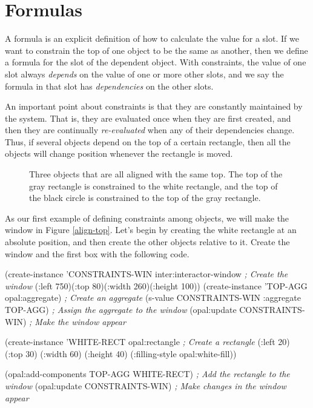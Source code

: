 \section{Formulas}

A formula is an explicit definition of how to calculate the value for
a slot.  If we want to constrain the top of one object to be the same
as another, then we define a formula for the  slot of the dependent
object.  With constraints, the value of one slot always {\it depends} on
the value of one or more other slots, and we say the formula in that
slot has {\it dependencies} on the other slots.

An important point about constraints is that they are constantly
maintained by the system.  That is, they are evaluated once when they
are first created, and then they are continually {\it re-evaluated} when
any of their dependencies change.  Thus, if several objects depend on
the top of a certain rectangle, then all the objects will change
position whenever the rectangle is moved.

\begin{figure}
\begin{center}
\begin{makeimage}
\end{makeimage}
\begin{latexonly}
\end{latexonly}
\end{center}
\caption{Three objects that are all aligned with the same top.  The
top of the gray rectangle is constrained to the white rectangle, and
the top of the black circle is constrained to the top of the gray rectangle.}
\end{figure}

As our first example of defining constraints among objects, we will
make the window in Figure \ref{align-top}.  Let's begin by creating
the white rectangle at an absolute position, and then create the other objects
relative to it.  Create the window and the first box with the
following code.

\begin{programexample}
(create-instance 'CONSTRAINTS-WIN inter:interactor-window      {\it ; Create the window}
   (:left 750)(:top 80)(:width 260)(:height 100))
(create-instance 'TOP-AGG opal:aggregate)                      {\it ; Create an aggregate}
(s-value CONSTRAINTS-WIN :aggregate TOP-AGG)                   {\it ; Assign the aggregate to the window}
(opal:update CONSTRAINTS-WIN)                                  {\it ; Make the window appear}

(create-instance 'WHITE-RECT opal:rectangle                    {\it ; Create a rectangle}
   (:left 20) (:top 30)
   (:width 60) (:height 40)
   (:filling-style opal:white-fill))
		
(opal:add-components TOP-AGG WHITE-RECT)                       {\it ; Add the rectangle to the window}
(opal:update CONSTRAINTS-WIN)                                  {\it ; Make changes in the window appear}
\end{programexample}

